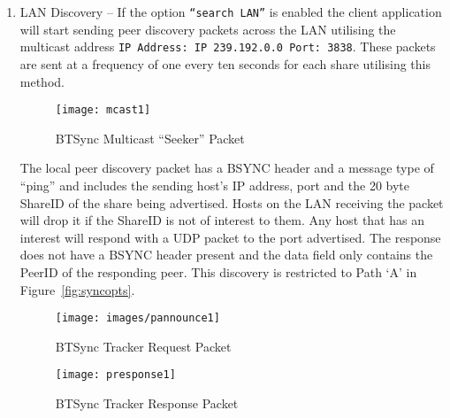 \documentclass[final,5p,times,twocolumn]{elsarticle}
\begin{document}
\begin{enumerate}
 \item LAN Discovery -- If the option \texttt{``search LAN''} is enabled the client application will start sending peer discovery packets across the LAN utilising the multicast address \texttt{IP Address: IP 239.192.0.0 Port: 3838}. These packets are sent at a frequency of one every ten seconds for each share utilising this method. 

\begin{figure}[!h]
\centering
\texttt{[image: mcast1]}
\caption{BTSync Multicast ``Seeker'' Packet}
\label{BTSyncMCast}
\end{figure}

The local peer discovery packet has a BSYNC header and a message type of ``ping'' and includes the sending host's IP address, port and the 20 byte ShareID of the share being advertised. Hosts on the LAN receiving the packet will drop it if the ShareID is not of interest to them. Any host that has an interest will respond with a UDP packet to the port advertised. The response does not have a BSYNC header present and the data field only contains the PeerID of the responding peer. This discovery is restricted to Path `A' in Figure~\ref{fig:syncopts}.

\begin{figure}[!h]
\centering
\texttt{[image: images/pannounce1]}
\caption{BTSync Tracker Request Packet}
\label{BTSyncRequest}
\end{figure}

 \begin{figure}[!h]
 \centering
 \texttt{[image: presponse1]}
 \caption{BTSync Tracker Response Packet}
 \label{BTSyncResponse}
 \end{figure}


\end{enumerate}
\end{document}

